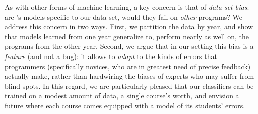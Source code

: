 As with other forms of machine learning,
a key concern is that of \emph{data-set bias}: are
\toolname's models specific
to our data set, would they fail on
\emph{other} programs?
%
We address this concern in two ways.
%
First, we partition the data by year,
and show that models learned from one
year generalize to, \ie perform nearly
as well on, the programs from the other
year.
%
Second, we argue that in our setting
this bias is a \emph{feature} (and not
a bug): it allows \toolname to \emph{adapt}
to the kinds of errors that programmers
(specifically novices, who are in greatest
need of precise feedback) actually make,
rather than hardwiring the biases of
experts who %
may suffer from blind spots. %
%
In this regard, we are particularly pleased
that our classifiers can be trained on a
modest amount of data, \ie a single course's
worth, and envision a future where each course
comes equipped with a model of its students' errors.



